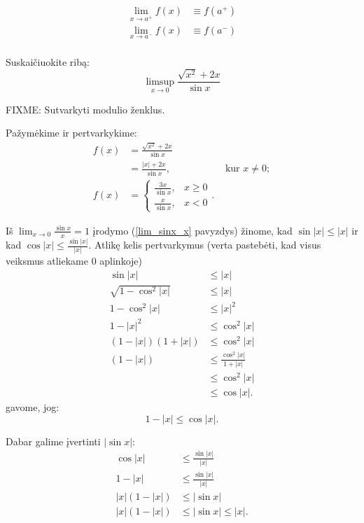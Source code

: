 \begin{notation}
  \begin{align*}
    \lim_{x \to a^{+}} f(x) &\equiv f(a^{+}) \\
    \lim_{x \to a^{-}} f(x) &\equiv f(a^{-}) \\
  \end{align*}
\end{notation}

\begin{exmp}
  Suskaičiuokite ribą:
  \begin{equation*}
    \limsup _{x \to 0} \frac{\sqrt{x^2} + 2x}{\sin x}
  \end{equation*}

  FIXME: Sutvarkyti modulio ženklus.

  Pažymėkime ir pertvarkykime:
  \begin{align*}
    f(x) 
    &= \frac{\sqrt{x^2} + 2x}{\sin x} \\
    &= \frac{|x| + 2x}{\sin x}, & \text{ kur } x \neq 0; \\
    f(x) 
    &=
    \begin{cases}
      \frac{3x}{\sin x}, & x \geq 0 \\
      \frac{x}{\sin x}, & x < 0
    \end{cases}.
  \end{align*}

  Iš $\lim_{x \to 0} \frac{\sin x}{x} = 1$ įrodymo 
  (\ref{lim_sinx_x} pavyzdys) žinome, kad $\sin |x| \leq |x|$ ir 
  kad $\cos |x| \leq \frac{\sin |x|}{|x|}$. Atlikę
  kelis pertvarkymus (verta pastebėti, kad visus veiksmus atliekame
  0 aplinkoje)
  \begin{align*}
    \sin |x| &\leq |x| \\
    \sqrt{1 - \cos ^{2} |x|} &\leq |x| \\
    1 - \cos^{2} |x| &\leq |x|^{2} \\
    1 - |x|^{2} &\leq \cos^{2} |x| \\
    (1 - |x|)(1 + |x|) &\leq \cos^{2} |x| \\
    (1 - |x|) &\leq \frac{\cos^{2} |x|}{1 + |x|} \\
      &\leq \cos^{2} |x| \\
      &\leq \cos |x|.
  \end{align*}
  gavome, jog:
  \begin{equation*}
    1 - |x| \leq \cos |x|.
  \end{equation*}

  Dabar galime įvertinti $|\sin x|$:
  \begin{align*}
    \cos |x| &\leq \frac{\sin |x|}{|x|}  \\
    1 - |x| &\leq \frac{\sin |x|}{|x|} \\
    |x|(1 - |x|) &\leq |\sin x| \\
    |x|(1 - |x|) &\leq |\sin x| \leq |x|.
  \end{align*}


\end{exmp}
